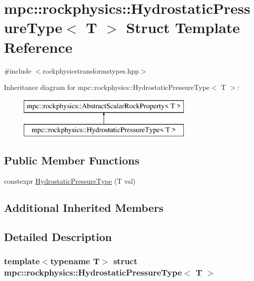 \hypertarget{structmpc_1_1rockphysics_1_1_hydrostatic_pressure_type}{}\section{mpc\+:\+:rockphysics\+:\+:Hydrostatic\+Pressure\+Type$<$ T $>$ Struct Template Reference}
\label{structmpc_1_1rockphysics_1_1_hydrostatic_pressure_type}


{\ttfamily \#include $<$rockphysicstransformstypes.\+hpp$>$}

Inheritance diagram for mpc\+:\+:rockphysics\+:\+:Hydrostatic\+Pressure\+Type$<$ T $>$\+:\begin{figure}[H]
\begin{center}
\leavevmode
\includegraphics[height=2.000000cm]{structmpc_1_1rockphysics_1_1_hydrostatic_pressure_type}
\end{center}
\end{figure}
\subsection*{Public Member Functions}
\begin{DoxyCompactItemize}
\item 
constexpr \mbox{\hyperlink{structmpc_1_1rockphysics_1_1_hydrostatic_pressure_type_a182e96fb2534e9a66ca8f1a600c0fd0d}{Hydrostatic\+Pressure\+Type}} (T val)
\end{DoxyCompactItemize}
\subsection*{Additional Inherited Members}


\subsection{Detailed Description}
\subsubsection*{template$<$typename T$>$\newline
struct mpc\+::rockphysics\+::\+Hydrostatic\+Pressure\+Type$<$ T $>$}



